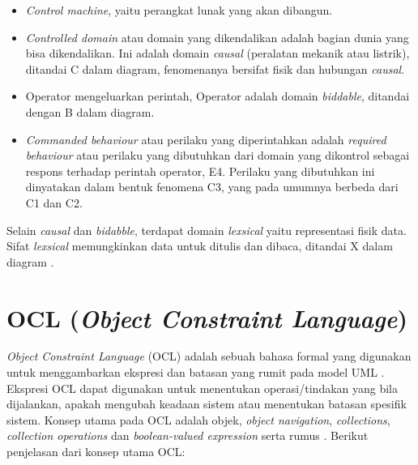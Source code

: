 \begin{itemize}
	\item \textit{Control machine}, yaitu perangkat lunak yang akan dibangun.
	\item \textit{Controlled domain} atau domain yang dikendalikan adalah bagian dunia yang bisa dikendalikan. Ini adalah domain \textit{causal} (peralatan mekanik atau listrik), ditandai C dalam diagram, fenomenanya bersifat fisik dan hubungan \textit{causal}. 
	\item Operator mengeluarkan perintah, Operator adalah domain \textit{biddable}, ditandai dengan B dalam diagram. 
	\item \textit{Commanded behaviour} atau perilaku yang diperintahkan adalah \textit{required behaviour} atau perilaku yang dibutuhkan dari domain yang dikontrol sebagai respons terhadap perintah operator, E4. Perilaku yang dibutuhkan ini dinyatakan dalam bentuk fenomena C3, yang pada umumnya berbeda dari C1 dan C2.
\end{itemize}
	
Selain \textit{causal} dan \textit{bidabble}, terdapat domain \textit{lexsical} yaitu representasi fisik data. Sifat \textit{lexsical} memungkinkan data untuk ditulis dan dibaca, ditandai X dalam diagram \citep{jackson2001}. 

\section{OCL (\textit{Object Constraint Language})}
\textit{Object Constraint Language} (OCL) adalah sebuah bahasa formal yang digunakan untuk menggambarkan ekspresi dan batasan yang rumit pada model UML \citep{cabot2014}. Ekspresi OCL dapat digunakan untuk menentukan operasi/tindakan yang bila dijalankan, apakah mengubah keadaan sistem atau menentukan batasan spesifik sistem. Konsep utama pada OCL adalah objek, \textit{object navigation}, \textit{collections}, \textit{collection operations} dan \textit{boolean-valued expression} serta rumus \citep{balaban2016}. Berikut penjelasan dari konsep utama OCL:

